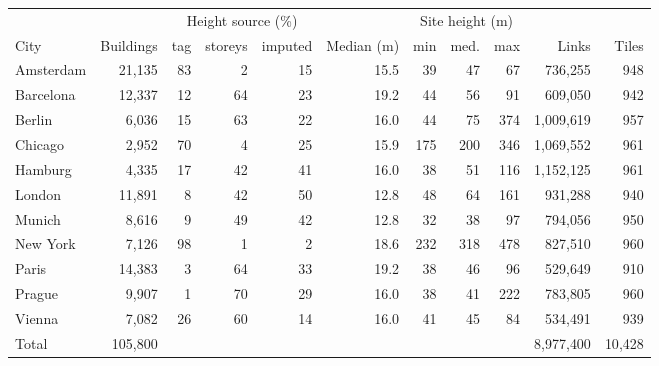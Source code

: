 \begin{tabular}{lrrrrrrrrrr}
\toprule
& & \multicolumn{3}{c}{Height source (\%)} & & \multicolumn{3}{c}{Site height (m)} & & \\
\cmidrule(lr){3-5}\cmidrule(lr){7-9}
City & Buildings & tag & storeys & imputed & Median (m) & min & med. & max & Links & Tiles \\
\midrule
Amsterdam & 21{,}135 & 83 & 2 & 15 & 15.5 & 39 & 47 & 67 & 736{,}255 & 948 \\
Barcelona & 12{,}337 & 12 & 64 & 23 & 19.2 & 44 & 56 & 91 & 609{,}050 & 942 \\
Berlin & 6{,}036 & 15 & 63 & 22 & 16.0 & 44 & 75 & 374 & 1{,}009{,}619 & 957 \\
Chicago & 2{,}952 & 70 & 4 & 25 & 15.9 & 175 & 200 & 346 & 1{,}069{,}552 & 961 \\
Hamburg & 4{,}335 & 17 & 42 & 41 & 16.0 & 38 & 51 & 116 & 1{,}152{,}125 & 961 \\
London & 11{,}891 & 8 & 42 & 50 & 12.8 & 48 & 64 & 161 & 931{,}288 & 940 \\
Munich & 8{,}616 & 9 & 49 & 42 & 12.8 & 32 & 38 & 97 & 794{,}056 & 950 \\
New York & 7{,}126 & 98 & 1 & 2 & 18.6 & 232 & 318 & 478 & 827{,}510 & 960 \\
Paris & 14{,}383 & 3 & 64 & 33 & 19.2 & 38 & 46 & 96 & 529{,}649 & 910 \\
Prague & 9{,}907 & 1 & 70 & 29 & 16.0 & 38 & 41 & 222 & 783{,}805 & 960 \\
Vienna & 7{,}082 & 26 & 60 & 14 & 16.0 & 41 & 45 & 84 & 534{,}491 & 939 \\
\midrule
Total & 105{,}800 & & & & & & & & 8{,}977{,}400 & 10{,}428 \\
\bottomrule
\end{tabular}

